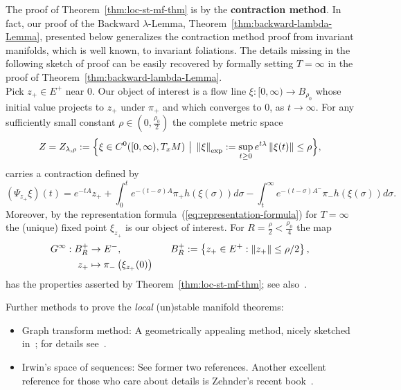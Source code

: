\documentclass{article}
\begin{document}
The proof of Theorem~\ref{thm:loc-st-mf-thm} is
by the {\bf contraction method}. In fact, our proof of the Backward $\lambda$-Lemma,
Theorem~\ref{thm:backward-lambda-Lemma}, presented below
generalizes the contraction method proof from invariant manifolds,
which is well known, to invariant foliations.
The details missing in the following sketch of
proof can be easily recovered by formally setting $T=\infty$
in the proof of Theorem~\ref{thm:backward-lambda-Lemma}.
\\
Pick $z_+\in E^+$ near $0$. Our object of interest
is a flow line $\xi:[0,\infty)\to B_{\rho_0}$
whose initial value projects to $z_+$ under $\pi_+$
and which converges to $0$, as $t\to\infty$.
For any sufficiently small constant
$\rho\in(0,\frac{\rho_0}{2})$ the complete metric space
\begin{equation}\label{eq:exp norm}
\begin{split}
     Z=Z_{\lambda,\rho}
     :=\Bigl\{\xi\in  
     C^0([0,\infty),T_xM)\,\,\big|\,\,
     \Norm{\xi}_{\exp}
     :=\sup_{t\ge 0} e^{t\lambda}
     \Norm{\xi(t)}
     \le\rho
     \Bigr\},
\end{split}
\end{equation}
carries a contraction defined by
\begin{equation*}
     (\Psi_{z_+}\xi)(t)
     =e^{-tA}z_+
     +\int_0^t e^{-(t-\sigma)A}\pi_+
     h(\xi(\sigma)) d\sigma
     -\int_t^\infty e^{-(t-\sigma)A^-}
     \pi_-h(\xi(\sigma)) d\sigma.
\end{equation*}
Moreover, by the representation formula~(\ref{eq:representation-formula})
for $T=\infty$ the (unique) fixed point $\xi_{z_+}$ is our object of
interest. For $R=\frac{\rho}{2}<\frac{\rho_0}{4}$ the map
\begin{equation*}%
\begin{split}
     G^\infty: B^+_R
     &\to E^-,
      \qquad\qquad\quad
      B^+_R
      :=\left\{z_+\in E^+:
      \Norm{z_+}\le\rho/2
      \right\},
   \\
     z_+
     &\mapsto \pi_-\left( \xi_{z_+}(0)\right)
\end{split}
\end{equation*}
has the properties asserted by Theorem~\ref{thm:loc-st-mf-thm};
see also~\cite[Sec.~3.6]{chow:1982a}.

\begin{remark}
Further methods to prove the \emph{local} (un)stable manifold theorems:
\begin{itemize}
\item
  Graph transform method: A geometrically appealing
  method, nicely sketched in~\cite[p.80]{palis:1982a};
  for details see~\cite{shub:1987a}.
\item
  Irwin's space of sequences:
  See former two references. Another excellent
  reference for those who care about details
  is Zehnder's recent book~\cite{zehnder:2010a}.
\end{itemize}
\end{remark}
\end{document}
